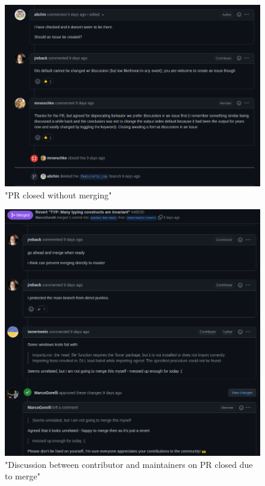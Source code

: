 \begin{figure}[hbt!]
\begin{center}
\includegraphics[width=.8\textwidth]{./images/closed_no_merge.png}
\caption{"PR closed without merging"}
\vspace{0in}
\end{center}
\end{figure}

\begin{figure}[hbt!]
\begin{center}
\includegraphics[width=.8\textwidth]{./images/merged_pr.png}
\caption{"Discussion between contributor and maintainers on PR closed due to merge"}
\vspace{0in}
\end{center}
\end{figure}

